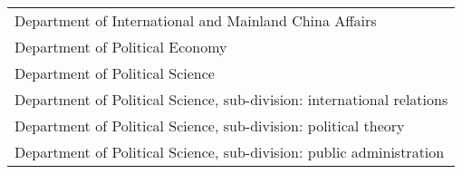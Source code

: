 \begin{table}[h]
{\begin{tabular}{@{}l@{}}
            Department of International and Mainland China Affairs                 \\
            Department of Political Economy                                        \\
            Department of Political Science                                        \\
            Department of Political Science, sub-division: international relations \\
            Department of Political Science, sub-division: political theory        \\
            Department of Political Science, sub-division: public administration   \\ \bottomrule
        \end{tabular}
    }
\end{table}